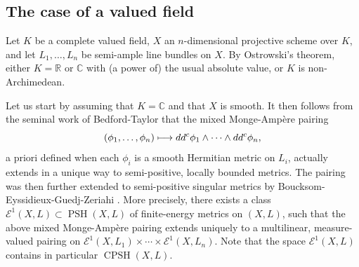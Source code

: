 \documentclass[JEP,XML,SOM,Unicode,published]{cedram}
\newcommand\mto{\mathchoice{\longmapsto}{\mapsto}{\mapsto}{\mapsto}}
\theoremstyle{definition}
\newcommand \C{\mathbb C}
\newcommand \R{\mathbb R}
\DeclareMathOperator{\CPSH}{CPSH}
\DeclareMathOperator{\PSH}{PSH}
\begin{document}
\subsection{The case of a valued field}
Let $K$ be a complete valued field, $X$ an $n$-dimensional projective scheme over $K$, and let $L_1,\dots, L_n$ be semi-ample line bundles on $X$. By Ostrowski's theorem, either $K = \R$ or $\C$ with (a power of) the usual absolute value, or $K$ is non-Archimedean.

Let us start by assuming that $K = \C$ and that $X$ is smooth. It then follows from the seminal work of Bedford-Taylor \cite{BT} that the mixed Monge-Ampère pairing
\[
(\phi_1,\dots,\phi_n) \mto dd^c \phi_1 \wedge\cdots  \wedge dd^c \phi_n,
\]
a priori defined when each $\phi_i$ is a smooth Hermitian metric on $L_i$, actually extends in a unique way to semi-positive, locally bounded metrics. The pairing was then further extended to semi-positive singular metrics by Boucksom-Eyssidieux-Guedj-Zeriahi \cite{BEGZ}. More precisely, there exists a class $\mathcal{E}^1(X, L) \subset \PSH(X,L)$ of finite-energy metrics on $(X,L)$, such that the above mixed Monge-Ampère pairing extends uniquely to a multilinear, measure-valued pairing on $\mathcal{E}^1(X,L_1) \times\cdots  \times \mathcal{E}^1(X,L_n)$. Note that the space $\mathcal{E}^1(X, L)$ contains in particular $\CPSH(X,L)$.
\end{document}
